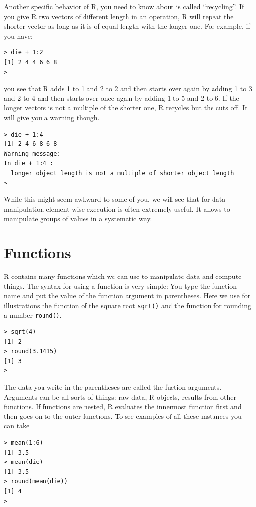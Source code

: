 \documentclass[
]{book}
\begin{document}
Another specific behavior of R, you need to know about is called ``recycling''. If you give
R two vectors of different length in an operation, R will repeat the shorter vector as long as
it is of equal length with the longer one. For example, if you have:

\begin{verbatim}
> die + 1:2
[1] 2 4 4 6 6 8
> 
\end{verbatim}

you see that R adds 1 to 1 and 2 to 2 and then starts over again by adding 1 to 3 and 2 to 4 and then
starts over once again by adding 1 to 5 and 2 to 6. If the longer vectors is not a multiple of the shorter one, R recycles but the cuts off. It will give you a warning though.

\begin{verbatim}
> die + 1:4
[1] 2 4 6 8 6 8
Warning message:
In die + 1:4 :
  longer object length is not a multiple of shorter object length
> 
\end{verbatim}

While this might seem awkward to some of you, we will see that for data manipulation
element-wise execution is often extremely useful. It allows to manipulate groups of values in
a systematic way.

\hypertarget{functions}{%
\section{Functions}\label{functions}}

R contains many functions which we can use to manipulate data and compute things. The syntax for
using a function is very simple: You type the function name and put the value of the function
argument in parentheses. Here we use for illustrations the function of the square root \texttt{sqrt()}
and the function for rounding a number \texttt{round()}.

\begin{verbatim}
> sqrt(4)
[1] 2
> round(3.1415)
[1] 3
> 
\end{verbatim}

The data you write in the parentheses are called the fuction arguments. Arguments can be all sorts of
things: raw data, R objects, results from other functions. If functions are nested, R evaluates the
innermost function first and then goes on to the outer functions. To see examples of all these instances
you can take

\begin{verbatim}
> mean(1:6)
[1] 3.5
> mean(die)
[1] 3.5
> round(mean(die))
[1] 4
> 
\end{verbatim}
\end{document}
